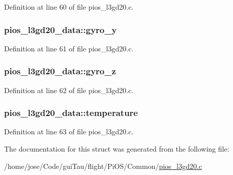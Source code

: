 Definition at line 60 of file pios\-\_\-l3gd20.\-c.

\hypertarget{structpios__l3gd20__data_a2254f9fac6f52d089cd6fb6b4ac59102}{
\subsubsection[{gyro\-\_\-y}]{ pios\-\_\-l3gd20\-\_\-data\-::gyro\-\_\-y}}\label{structpios__l3gd20__data_a2254f9fac6f52d089cd6fb6b4ac59102}


Definition at line 61 of file pios\-\_\-l3gd20.\-c.

\hypertarget{structpios__l3gd20__data_ac96a0621539a472ffc044b6246663835}{
\subsubsection[{gyro\-\_\-z}]{ pios\-\_\-l3gd20\-\_\-data\-::gyro\-\_\-z}}\label{structpios__l3gd20__data_ac96a0621539a472ffc044b6246663835}


Definition at line 62 of file pios\-\_\-l3gd20.\-c.

\hypertarget{structpios__l3gd20__data_a51c36a0ee690ccc92f547888f0898759}{
\subsubsection[{temperature}]{ pios\-\_\-l3gd20\-\_\-data\-::temperature}}\label{structpios__l3gd20__data_a51c36a0ee690ccc92f547888f0898759}


Definition at line 63 of file pios\-\_\-l3gd20.\-c.



The documentation for this struct was generated from the following file\-:\begin{DoxyCompactItemize}
\item 
/home/jose/\-Code/gui\-Tau/flight/\-Pi\-O\-S/\-Common/\hyperlink{pios__l3gd20_8c}{pios\-\_\-l3gd20.\-c}\end{DoxyCompactItemize}
